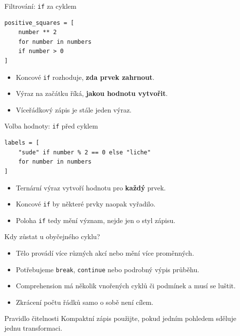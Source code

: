 \documentclass[aspectratio=169,t]{beamer}
\begin{document}
\begin{frame}[fragile]{Filtrování: \texttt{if} za cyklem}
\begin{lstlisting}[style=python]
positive_squares = [
    number ** 2
    for number in numbers
    if number > 0
]
\end{lstlisting}
  \begin{itemize}
    \item Koncové \texttt{if} rozhoduje, \textbf{zda prvek zahrnout}.
    \item Výraz na začátku říká, \textbf{jakou hodnotu vytvořit}.
    \item Víceřádkový zápis je stále jeden výraz.
  \end{itemize}
\end{frame}

\begin{frame}[fragile]{Volba hodnoty: \texttt{if} před cyklem}
\begin{lstlisting}[style=python]
labels = [
    "sude" if number % 2 == 0 else "liche"
    for number in numbers
]
\end{lstlisting}
  \begin{itemize}
    \item Ternární výraz vytvoří hodnotu pro \textbf{každý} prvek.
    \item Koncové \texttt{if} by některé prvky naopak vyřadilo.
    \item Poloha \texttt{if} tedy mění význam, nejde jen o styl zápisu.
  \end{itemize}
\end{frame}

\begin{frame}{Kdy zůstat u obyčejného cyklu?}
  \begin{itemize}
    \item Tělo provádí více různých akcí nebo mění více proměnných.
    \item Potřebujeme \texttt{break}, \texttt{continue} nebo podrobný výpis průběhu.
    \item Comprehension má několik vnořených cyklů či podmínek a musí se luštit.
    \item Zkrácení počtu řádků samo o sobě není cílem.
  \end{itemize}
  \begin{block}{Pravidlo čitelnosti}
    Kompaktní zápis použijte, pokud jedním pohledem sděluje jednu transformaci.
  \end{block}
\end{frame}
\end{document}
